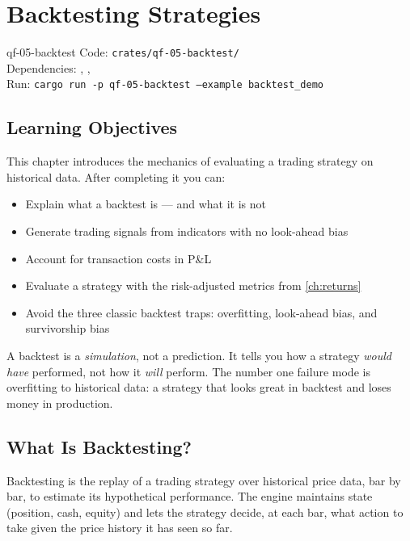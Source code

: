\chapter{Backtesting Strategies}
\label{ch:backtest}

\begin{companioncode}{qf-05-backtest}
Code: \texttt{crates/qf-05-backtest/}\\
Dependencies: , , \\
Run: \texttt{cargo run -p qf-05-backtest --example backtest\_demo}
\end{companioncode}

\section{Learning Objectives}

This chapter introduces the mechanics of evaluating a trading strategy on
historical data. After completing it you can:

\begin{itemize}
    \item Explain what a backtest is --- and what it is not
    \item Generate trading signals from indicators with no look-ahead bias
    \item Account for transaction costs in P\&L
    \item Evaluate a strategy with the risk-adjusted metrics from
      \cref{ch:returns}
    \item Avoid the three classic backtest traps: overfitting, look-ahead
      bias, and survivorship bias
\end{itemize}

\begin{keyinsight}
A backtest is a \emph{simulation}, not a prediction. It tells you how a
strategy \emph{would have} performed, not how it \emph{will} perform. The number
one failure mode is overfitting to historical data: a strategy that looks
great in backtest and loses money in production.
\end{keyinsight}

\section{What Is Backtesting?}

Backtesting is the replay of a trading strategy over historical price data,
bar by bar, to estimate its hypothetical performance. The engine maintains
state (position, cash, equity) and lets the strategy decide, at each bar,
what action to take given the price history it has seen so far.

